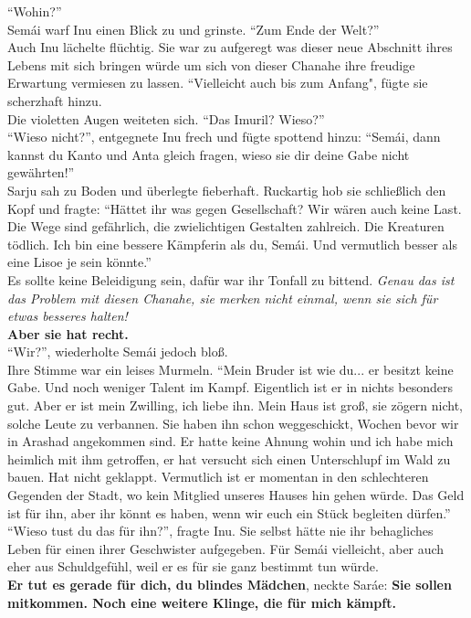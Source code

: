 ``Wohin?''\\
Semái warf Inu einen Blick zu und grinste. ``Zum Ende der Welt?''\\
Auch Inu lächelte flüchtig. Sie war zu aufgeregt was dieser neue Abschnitt ihres Lebens mit sich 
bringen würde um sich von dieser Chanahe ihre freudige Erwartung vermiesen zu lassen. ``Vielleicht 
auch bis zum Anfang", fügte sie scherzhaft hinzu.\\
Die violetten Augen weiteten sich. ``Das Imuril? Wieso?''\\
``Wieso nicht?'', entgegnete Inu frech und fügte spottend hinzu: ``Semái, dann kannst du Kanto und 
Anta gleich fragen, wieso sie dir deine Gabe nicht gewährten!''\\
Sarju sah zu Boden und überlegte fieberhaft. Ruckartig hob sie schließlich den Kopf und fragte: 
``Hättet ihr was gegen Gesellschaft? Wir wären auch keine Last. Die Wege sind gefährlich, die 
zwielichtigen Gestalten zahlreich. Die Kreaturen tödlich. Ich bin eine bessere Kämpferin als du, 
Semái. Und vermutlich besser als eine Lisoe je sein könnte.''\\
Es sollte keine Beleidigung sein, dafür war ihr Tonfall zu bittend. \textit{Genau das ist das 
Problem mit diesen Chanahe, sie merken nicht einmal, wenn sie sich für etwas besseres halten!}\\
\textbf{Aber sie hat recht.}\\
``Wir?'', wiederholte Semái jedoch bloß.\\
Ihre Stimme war ein leises Murmeln. ``Mein Bruder ist wie du... er besitzt keine Gabe. Und noch 
weniger Talent im Kampf. Eigentlich ist er in nichts besonders gut. Aber er ist mein Zwilling, ich 
liebe ihn. Mein Haus ist groß, sie zögern nicht, solche Leute zu verbannen. Sie haben ihn schon 
weggeschickt, Wochen bevor wir in Arashad angekommen sind. Er hatte keine Ahnung wohin und ich habe 
mich heimlich mit ihm getroffen, er hat versucht sich einen Unterschlupf im Wald zu bauen. Hat 
nicht geklappt. Vermutlich ist er momentan in den schlechteren Gegenden der Stadt, wo kein 
Mitglied unseres Hauses hin gehen würde. Das Geld ist für ihn, aber ihr könnt es haben, wenn wir 
euch ein Stück begleiten dürfen.''\\
``Wieso tust du das für ihn?'', fragte Inu. Sie selbst hätte nie ihr behagliches Leben für einen 
ihrer Geschwister aufgegeben. Für Semái vielleicht, aber auch eher aus Schuldgefühl, weil er es für 
sie ganz bestimmt tun würde. \\
\textbf{Er tut es gerade für dich, du blindes Mädchen}, neckte Saráe: \textbf{Sie sollen mitkommen. 
Noch eine weitere Klinge, die für mich kämpft.}\\

